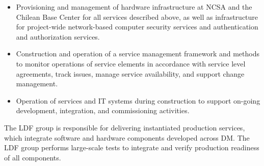 \begin{itemize}
	\item	Provisioning and management of hardware infrastructure at NCSA and the Chilean Base Center for all services described above, as well as infrastructure for project-wide network-based computer security services and authentication and authorization services.
	\item	\gls{Construction} and operation of a service management framework and methods to monitor operations of service elements in accordance with service level agreements, track issues, manage service availability, and support change management.
	\item	Operation of services and \gls{IT} systems during construction to support on-going development, integration, and commissioning activities.
\end{itemize}

The \gls{LDF} group is responsible for delivering instantiated production services, which integrate software and hardware components developed across \gls{DM}. The \gls{LDF} group performs large-scale tests to integrate and verify production readiness of all components.
